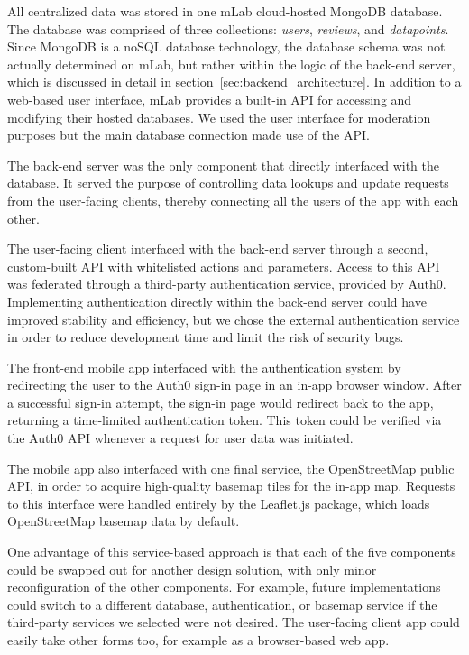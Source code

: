 All centralized data was stored in one mLab cloud-hosted MongoDB database. The database was comprised of three collections: \textit{users}, \textit{reviews}, and \textit{datapoints}. Since MongoDB is a noSQL database technology, the database schema was not actually determined on mLab, but rather within the logic of the back-end server, which is discussed in detail in section~\ref{sec:backend_architecture}. In addition to a web-based user interface, mLab provides a built-in API for accessing and modifying their hosted databases. We used the user interface for moderation purposes but the main database connection made use of the API.

The back-end server was the only component that directly interfaced with the database. It served the purpose of controlling data lookups and update requests from the user-facing clients, thereby connecting all the users of the app with each other.

The user-facing client interfaced with the back-end server through a second, custom-built API with whitelisted actions and parameters. Access to this API was federated through a third-party authentication service, provided by Auth0. Implementing authentication directly within the back-end server could have improved stability and efficiency, but we chose the external authentication service in order to reduce development time and limit the risk of security bugs.

The front-end mobile app interfaced with the authentication system by redirecting the user to the Auth0 sign-in page in an in-app browser window. After a successful sign-in attempt, the sign-in page would redirect back to the app, returning a time-limited authentication token. This token could be verified via the Auth0 API whenever a request for user data was initiated.

The mobile app also interfaced with one final service, the OpenStreetMap public API, in order to acquire high-quality basemap tiles for the in-app map. Requests to this interface were handled entirely by the Leaflet.js package, which loads OpenStreetMap basemap data by default.

One advantage of this service-based approach is that each of the five components could be swapped out for another design solution, with only minor reconfiguration of the other components. For example, future implementations could switch to a different database, authentication, or basemap service if the third-party services we selected were not desired. The user-facing client app could easily take other forms too, for example as a browser-based web app.


